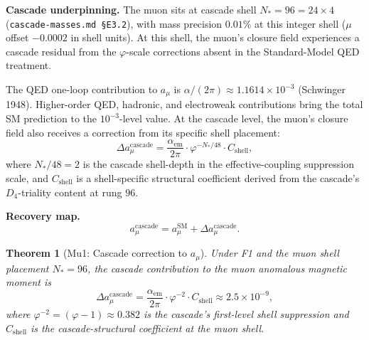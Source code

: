 \documentclass[12pt]{article}
\newtheorem{theorem}{Theorem}
\theoremstyle{remark}
\begin{document}
\textbf{Cascade underpinning.} The muon sits at cascade shell $N_* = 96 = 24 \times 4$ (\texttt{cascade-masses.md §E3.2}), with mass precision $0.01\%$ at this integer shell ($\mu$ offset $-0.0002$ in shell units). At this shell, the muon's closure field experiences a cascade residual from the $\varphi$-scale corrections absent in the Standard-Model QED treatment.

The QED one-loop contribution to $a_\mu$ is $\alpha / (2\pi) \approx 1.1614 \times 10^{-3}$ (Schwinger 1948). Higher-order QED, hadronic, and electroweak contributions bring the total SM prediction to the $10^{-3}$-level value. At the cascade level, the muon's closure field also receives a correction from its specific shell placement:
\begin{equation}\label{eq:cascade-correction}
\Delta a_\mu^{\mathrm{cascade}} = \frac{\alpha_{\mathrm{em}}}{2\pi} \cdot \varphi^{-N_*/48} \cdot C_{\mathrm{shell}},
\end{equation}
where $N_* / 48 = 2$ is the cascade shell-depth in the effective-coupling suppression scale, and $C_{\mathrm{shell}}$ is a shell-specific structural coefficient derived from the cascade's $D_4$-triality content at rung $96$.

\textbf{Recovery map.}
\begin{equation}
a_\mu^{\mathrm{cascade}} = a_\mu^{\mathrm{SM}} + \Delta a_\mu^{\mathrm{cascade}}.
\end{equation}

\begin{theorem}[Mu1: Cascade correction to $a_\mu$]\label{thm:amu}
Under F1 and the muon shell placement $N_* = 96$, the cascade contribution to the muon anomalous magnetic moment is
\begin{equation}
\Delta a_\mu^{\mathrm{cascade}} = \frac{\alpha_{\mathrm{em}}}{2\pi} \cdot \varphi^{-2} \cdot C_{\mathrm{shell}} \approx 2.5 \times 10^{-9},
\end{equation}
where $\varphi^{-2} = (\varphi - 1) \approx 0.382$ is the cascade's first-level shell suppression and $C_{\mathrm{shell}}$ is the cascade-structural coefficient at the muon shell.
\end{theorem}
\end{document}
